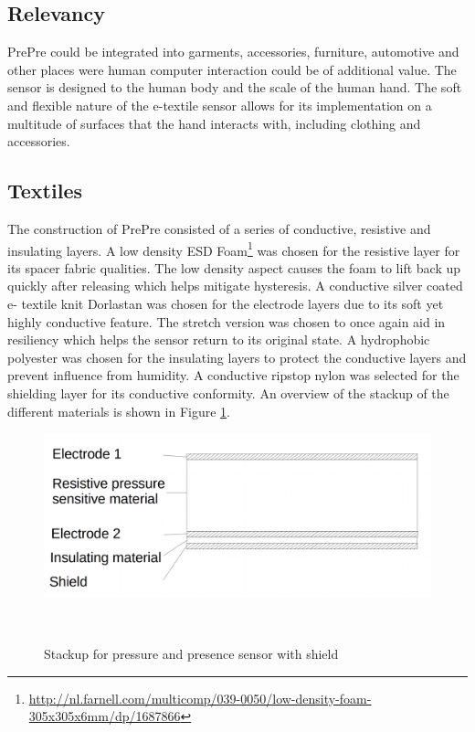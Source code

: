 \documentclass{sigchi-ext}
\begin{document}
\subsection{Relevancy}
 PrePre could be integrated into garments, accessories, furniture, automotive and other places were human computer interaction could be of additional value. The sensor is designed to the human body and the scale of the human hand. The soft and flexible nature of the e-textile sensor allows for its implementation on a multitude of surfaces that the hand interacts with, including clothing and accessories. 
\subsection{Textiles}
The construction of PrePre consisted of a series of conductive, resistive and insulating layers. A low density ESD Foam\footnote{\url{http://nl.farnell.com/multicomp/039-0050/low-density-foam-305x305x6mm/dp/1687866}} was chosen for the resistive layer for its spacer fabric qualities. The low density aspect causes the foam to lift back up quickly after releasing which helps mitigate hysteresis. A conductive silver coated e- textile knit Dorlastan was chosen for the electrode layers due to its soft yet highly conductive feature. The stretch version was chosen to once again aid in resiliency which helps the sensor return to its original state. A hydrophobic polyester was chosen for the insulating layers to protect the conductive layers and prevent influence from humidity. A conductive ripstop nylon was selected for the shielding layer for its conductive conformity. An overview of the stackup of the different materials is shown in Figure \ref{fig:stackup}.


\begin{figure}[!htbp]
\centering
  \includegraphics[trim={0 2cm 0 2cm},clip,width=0.9\columnwidth]{figures/stackup}
  \caption{Stackup for pressure and presence sensor with
shield}~\label{fig:stackup}
\end{figure}
\end{document}
